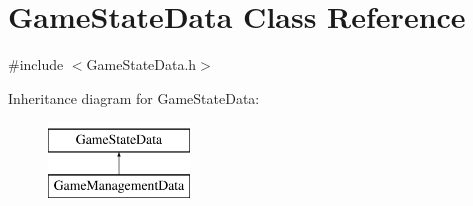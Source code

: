 \hypertarget{classGameStateData}{\section{Game\-State\-Data Class Reference}
\label{classGameStateData}
}


{\ttfamily \#include $<$Game\-State\-Data.\-h$>$}

Inheritance diagram for Game\-State\-Data\-:\begin{figure}[H]
\begin{center}
\leavevmode
\includegraphics[height=2.000000cm]{classGameStateData}
\end{center}
\end{figure}
